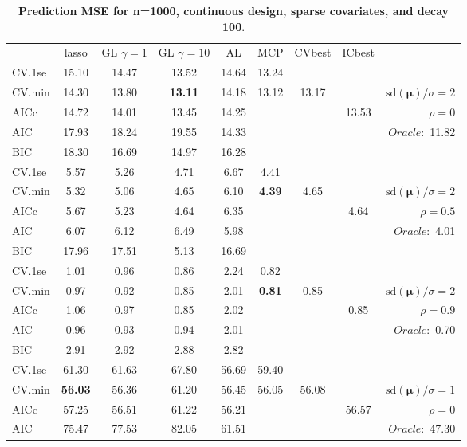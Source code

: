 \clearpage
\begin{table}\vspace{-.5cm}
\caption[l]{ { \bf Prediction MSE for n=1000, continuous design, 
sparse covariates, and  decay  100}.}
\vspace{-.5cm}
\footnotesize{}
\begin{center}
\begin{tabular}{l*{7}{c}|r}
 & lasso & GL $\gamma=1$ & GL $\gamma=10$ & AL & MCP  & CVbest & ICbest  \\
\cline{1-9}
CV.1se & 15.10 & 14.47 & 13.52 & 14.64 & 13.24 & & & \\
CV.min & 14.30 & 13.80 & {\bf 13.11} & 14.18 & 13.12 & 13.17 & & $\mathrm{sd}(\mathbf{\mu})/\sigma=2$ \\
AICc & 14.72 & 14.01 & 13.45 & 14.25 & & & 13.53 &  $\rho=0$ \\
AIC & 17.93 & 18.24 & 19.55 & 14.33 & & & &  \multirow{2}{*}{$Oracle: $ 11.82} \\
BIC & 18.30 & 16.69 & 14.97 & 16.28 & & & &  \\
 \hline 
CV.1se & 5.57 & 5.26 & 4.71 & 6.67 & 4.41 & & & \\
CV.min & 5.32 & 5.06 & 4.65 & 6.10 & {\bf 4.39} & 4.65 & & $\mathrm{sd}(\mathbf{\mu})/\sigma=2$ \\
AICc & 5.67 & 5.23 & 4.64 & 6.35 & & & 4.64 &  $\rho=0.5$ \\
AIC & 6.07 & 6.12 & 6.49 & 5.98 & & & &  \multirow{2}{*}{$Oracle: $ 4.01} \\
BIC & 17.96 & 17.51 & 5.13 & 16.69 & & & &  \\
 \hline 
CV.1se & 1.01 & 0.96 & 0.86 & 2.24 & 0.82 & & & \\
CV.min & 0.97 & 0.92 & 0.85 & 2.01 & {\bf 0.81} & 0.85 & & $\mathrm{sd}(\mathbf{\mu})/\sigma=2$ \\
AICc & 1.06 & 0.97 & 0.85 & 2.02 & & & 0.85 &  $\rho=0.9$ \\
AIC & 0.96 & 0.93 & 0.94 & 2.01 & & & &  \multirow{2}{*}{$Oracle: $ 0.70} \\
BIC & 2.91 & 2.92 & 2.88 & 2.82 & & & &  \\
 \hline 
CV.1se & 61.30 & 61.63 & 67.80 & 56.69 & 59.40 & & & \\
CV.min & {\bf 56.03} & 56.36 & 61.20 & 56.45 & 56.05 & 56.08 & & $\mathrm{sd}(\mathbf{\mu})/\sigma=1$ \\
AICc & 57.25 & 56.51 & 61.22 & 56.21 & & & 56.57 &  $\rho=0$ \\
AIC & 75.47 & 77.53 & 82.05 & 61.51 & & & &  \multirow{2}{*}{$Oracle: $ 47.30} \\

\end{tabular}
\end{center}
\end{table}

